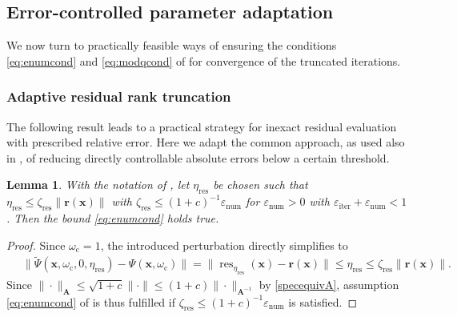 \documentclass[a4paper,11pt,oneside]{amsart}
\providecommand{\norm}[1]{\lVert#1\rVert}
\newtheorem{lemma}[theorem]{Lemma}
\theoremstyle{definition}
\theoremstyle{remark}
\newcommand{\A}{\ten A}
\newcommand{\ten}[1]{\boldsymbol{#1}}
\newcommand{\enum}{\ensuremath{\varepsilon_{\mathrm{num}}}}
\newcommand{\eiter}{\ensuremath{\varepsilon_{\mathrm{iter}}}}
\newcommand{\etares}{\eta_{\mathrm{res}}}
\newcommand{\zetares}{\zeta_{\mathrm{res}}}
\numberwithin{equation}{section}
\numberwithin{theorem}{section}
\begin{document}
\subsection{Error-controlled parameter adaptation}\label{truncdetail}

We now turn to practically feasible ways of ensuring the conditions \eqref{eq:enumcond} and \eqref{eq:modqcond} of  for convergence of the truncated iterations.

\subsubsection{Adaptive residual rank truncation}\label{truncr}

The following result leads to a practical strategy for inexact residual evaluation with prescribed relative error. Here we adapt the common approach, as used also in \cite{Rohwedder:11}, of reducing directly controllable absolute errors below a certain threshold.

\begin{lemma}\label{lem:truncr}
 With the notation of , let $\etares$ be chosen such that $\etares \leq  \zetares \| \ten r(\ten x) \|$ with
 $\zetares \leq (1+c)^{-1} \enum$ for $\enum > 0$ with $\eiter + \enum < 1$. Then the bound \eqref{eq:enumcond} holds true.
\end{lemma}
\begin{proof}
Since $\omega_{\mathrm{c}} = 1$, the introduced perturbation directly simplifies to
\begin{align*}
 & \ \| \tilde \Psi(\ten x, \omega_{\mathrm{c}}, 0, \etares) - \Psi(\ten x, \omega_{\mathrm{c}})\|
 = \norm{ \operatorname{res}_{\etares}(\ten x)  -  \ten r(\ten x)  }  \leq \etares \leq  \zetares \| \ten r(\ten x) \|.
\end{align*}
Since $\| \cdot \|_{\A} \leq \sqrt{1+c}  \| \cdot \| \leq (1+c)  \| \cdot \|_{\A^{-1}}$ by \eqref{specequivA}, assumption \eqref{eq:enumcond} of  is thus fulfilled if $\zetares \leq (1+c)^{-1} \enum$ is satisfied.
\end{proof}
\end{document}
